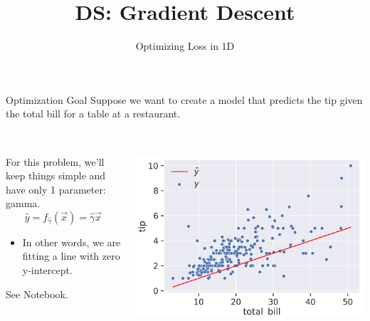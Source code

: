 \documentclass[aspectratio=169]{../latex_main/tntbeamer}  %
\title[Introduction]{DS: Gradient Descent}
\subtitle{Optimizing Loss in 1D}
\begin{document}
	
	\maketitle
	\begin{frame}{Optimization Goal}
	    Suppose we want to create a model that predicts the tip given the total bill for a table at a restaurant.\\
	    \bigskip
	    \begin{columns}
	     \begin{column}{.5\textwidth}
	        \\
	         For this problem, we’ll keep things simple and have only 1 parameter: gamma.
	             \begin{equation*}
	                 \hat{y}  = f_{\hat{\gamma}}(\Vec{x})  = \hat{\gamma}\Vec{x}
                \end{equation*}
	            \begin{itemize}
                     \item In other words, we are fitting a line with zero y-intercept.
	             \end{itemize}
	             \bigskip
	             See Notebook.
	     \end{column}
	     
	     
	     \begin{column}{.5\textwidth}
	            \\
              \hspace{0cm} \includegraphics[scale=.4]{Bild9}\\
	     \end{column}
	    \end{columns}
	\end{frame}
	
\end{document}

